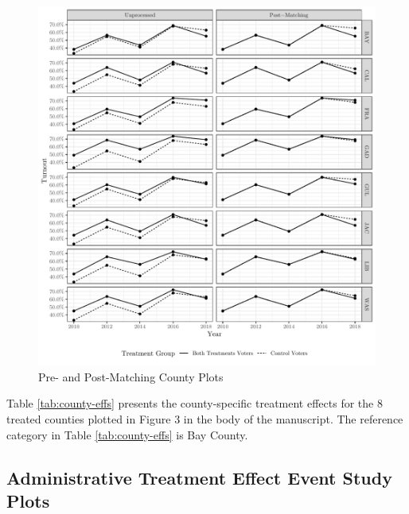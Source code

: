 \documentclass[
  12pt,
]{article}
\begin{document}
\begin{figure}[H]

{\centering \includegraphics{si_files/figure-latex/indcs-chunk-1} 

}

\caption{\label{fig:ind-counties}Pre- and Post-Matching County Plots}\label{fig:indcs-chunk}
\end{figure}

Table \ref{tab:county-effs} presents the county-specific treatment effects for the 8 treated counties plotted in Figure 3 in the body of the manuscript. The reference category in Table \ref{tab:county-effs} is Bay County.

\begin{singlespace}

\end{singlespace}

\hypertarget{administrative-treatment-effect-event-study-plots}{%
\subsection*{Administrative Treatment Effect Event Study Plots}\label{administrative-treatment-effect-event-study-plots}}
\end{document}
